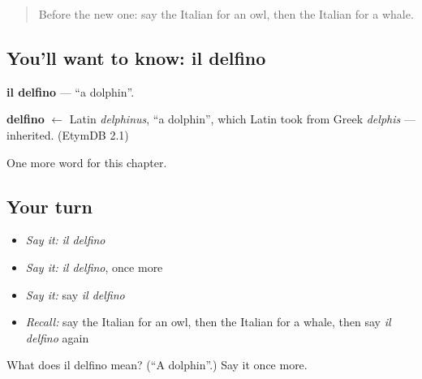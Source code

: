 \label{lesson:IT-C121-delfino}



\begin{quote}
Before the new one: say the Italian for an owl, then the Italian for a whale.
\end{quote}

\subsection*{You'll want to know: il delfino}
\textbf{il delfino} — \textquotedblleft{}a dolphin\textquotedblright{}.

\begin{cousinweb}
\textbf{delfino} $\leftarrow$ Latin \emph{delphinus}, \textquotedblleft{}a dolphin\textquotedblright{}, which Latin took from Greek \emph{delphis} — inherited. (EtymDB 2.1)
\end{cousinweb}

\begin{grammarlens}[title={What you've built}]
One more word for this chapter.
\end{grammarlens}

\subsection*{Your turn}
\begin{itemize}
\raggedright
  \item \emph{Say it:} \emph{il delfino}
  \item \emph{Say it:} \emph{il delfino}, once more
  \item \emph{Say it:} say \emph{il delfino}
  \item \emph{Recall:} say the Italian for an owl, then the Italian for a whale, then say \emph{il delfino} again
\end{itemize}

\begin{tcolorbox}[breakable,colback=teal!4,colframe=teal!35!black,title={Before you move on}]
What does il delfino mean? (\textquotedblleft{}A dolphin\textquotedblright{}.) Say it once more.
\end{tcolorbox}

